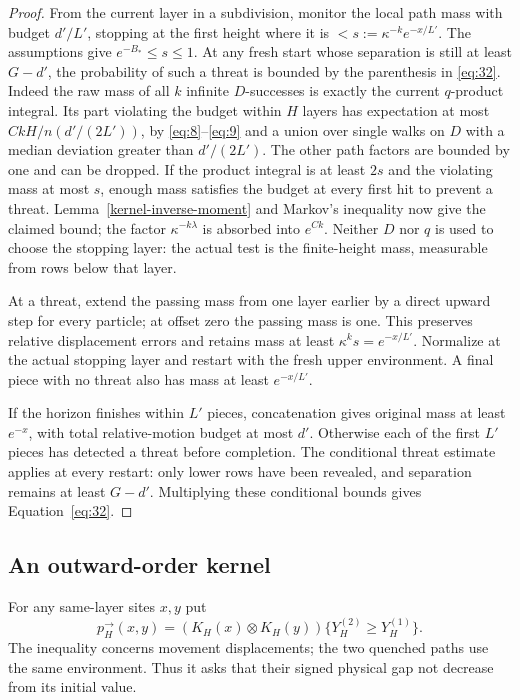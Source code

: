 \begin{proof}
From the current layer in a subdivision, monitor the local path mass
with budget \(d'/L'\), stopping at the first height where it is
\(<s:=\kappa^{-k}e^{-x/L'}\). The assumptions give
\(e^{-B_*}\le s\le1\). At any fresh start whose separation is still
at least \(G-d'\), the probability of such a threat is bounded by the
parenthesis in \eqref{eq:32}. Indeed the raw mass of all \(k\) infinite
\(D\)-successes is exactly the current \(q\)-product integral. Its
part violating the budget within \(H\) layers has expectation at most
\(CkH/n(d'/(2L'))\), by \eqref{eq:8}--\eqref{eq:9} and a union over
single walks on \(D\) with a median deviation greater than
\(d'/(2L')\). The other path factors are bounded by one and can be
dropped. If the product integral is at least \(2s\) and the violating
mass at most \(s\), enough mass satisfies the budget at every first
hit to prevent a threat. Lemma~\ref{kernel-inverse-moment} and Markov's
inequality now give the claimed bound; the factor
\(\kappa^{-k\lambda}\) is absorbed into \(e^{Ck}\). Neither \(D\) nor
\(q\) is used to choose the stopping layer: the actual test is the
finite-height mass, measurable from rows below that layer.

At a threat, extend the passing mass from one layer earlier by a direct
upward step for every particle; at offset zero the passing mass is one.
This preserves relative displacement errors and retains mass at least
\(\kappa^ks=e^{-x/L'}\). Normalize at the actual stopping layer and
restart with the fresh upper environment. A final piece with no threat
also has mass at least \(e^{-x/L'}\).

If the horizon finishes within \(L'\) pieces, concatenation gives
original mass at least \(e^{-x}\), with total relative-motion budget
at most \(d'\). Otherwise each of the first \(L'\) pieces has
detected a threat before completion. The conditional threat estimate
applies at every restart: only lower rows have been revealed, and
separation remains at least \(G-d'\). Multiplying these conditional
bounds gives Equation~\eqref{eq:32}.
\end{proof}

\subsection{An outward-order kernel}

For any same-layer sites \(x,y\) put
\[
p_H^\to(x,y)=(K_H(x)\otimes K_H(y))\{Y_H^{(2)}\ge Y_H^{(1)}\}.
\]
The inequality concerns movement displacements; the two quenched paths
use the same environment. Thus it asks that their signed physical gap
not decrease from its initial value.

